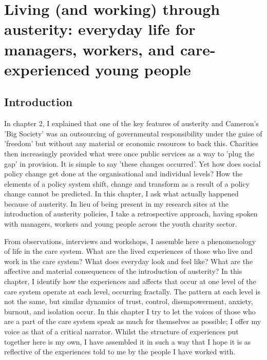 \chapter{Living (and working) through austerity: everyday life for managers, workers, and care-experienced young people}
\label{5}

\section{Introduction}
\label{sec:}

In chapter 2, I explained that one of the key features of austerity and Cameron's 'Big Society' was an outsourcing of governmental responsibility under the guise of 'freedom' but without any material or economic resources to back this. Charities then increasingly provided what were once public services as a way to 'plug the gap' in provision. It is simple to say 'these changes occurred'. Yet how does social policy change get done at the organisational and individual levels? How the elements of a policy system shift, change and transform as a result of a policy change cannot be predicted. In this chapter, I ask what actually happened because of austerity. In lieu of being present in my research sites at the introduction of austerity policies, I take a retrospective approach, having spoken with managers, workers and young people across the youth charity sector.


From observations, interviews and workshops, I assemble here a phenomenology of life in the care system. What are the lived experiences of those who live and work in the care system? What does everyday look and feel like? What are the affective and material consequences of the introduction of austerity? In this chapter, I identify how the experiences and affects that occur at one level of the care system operate at each level, occurring fractally. The pattern at each level is not the same, but similar dynamics of trust, control, disempowerment, anxiety, burnout, and isolation occur. In this chapter I try to let the voices of those who are a part of the care system speak as much for themselves as possible; I offer my voice as that of a critical narrator. Whilst the structure of experiences put together here is my own, I have assembled it in such a way that I hope it is as reflective of the experiences told to me by the people I have worked with.


